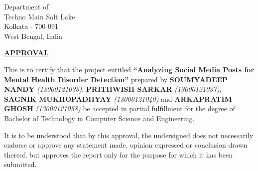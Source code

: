 \thispagestyle{plain}

\noindent
Department of {\mydep} \\
Techno Main Salt Lake \\
Kolkata - 700 091\\
West Bengal, India

\vspace{0.5\baselineskip}
\vspace{1\baselineskip}

\begin{center}
{\Large {\bf \underline{ \uppercase{Approval}}}}
\end{center}

\vspace{\baselineskip}

\noindent

\begin{center}
   This is to certify that the project entitled \textbf{“Analyzing Social Media Posts for Mental Health Disorder Detection”} prepared by \textbf{SOUMYADEEP NANDY}   \emph{(13000121033)}, \textbf{PRITHWISH SARKAR} \emph{(13000121037)}, \textbf{SAGNIK MUKHOPADHYAY} \emph{(13000121040)} and \textbf{ARKAPRATIM GHOSH} \emph{(13000121058)} be accepted in
partial fulfillment for the degree of Bachelor of Technology in Computer Science and Engineering. 
\end{center}


\begin{center}
    \vspace{1\baselineskip}
It is to be understood that by this approval, the undersigned does not necessarily endorse or approve any statement made, opinion expressed or conclusion drawn thereof, but
approves the report only for the purpose for which it has been submitted.
\end{center}




